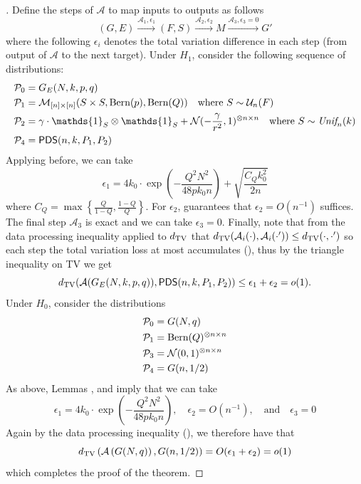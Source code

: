 \documentclass[final,12pt]{colt2023} %
\newcommand\1[1]{\mathbb{I}_{\left\{#1\right\}}}
\newcommand{\one}{\mathds{1}}
\begin{document}
\begin{proof}[]
Define the steps of $\mathcal{A}$ to map inputs to outputs as follows
$$(G, E) \xrightarrow{\mathcal{A}_1, \epsilon_1} (F, S) \xrightarrow{\mathcal{A}_2, \epsilon_2} M \xrightarrow{\mathcal{A}_{\text{3}}, \epsilon_3=0} G'$$
where the following $\epsilon_i$ denotes the total variation difference in each step (from output of $\mathcal{A}$ to the next target). Under $H_1$, consider the following sequence of distributions:
\allowdisplaybreaks
\begin{align*}
\mathcal{P}_0 &= G_E(N, k, p, q) \\
\mathcal{P}_1 &= \mathcal{M}_{[n] \times [n]}(S \times S, \textnormal{Bern}(p), \textnormal{Bern}(Q)) \quad \text{where } S \sim \mathcal{U}_n(F) \\
\mathcal{P}_2 &= \gamma \cdot \one_S\otimes \one_S + \N(-\frac{\gamma}{r^2}, 1)^{\otimes n \times n} \quad \text{where } S \sim \textit{Unif}_n(k) \\
\mathcal{P}_{\text{4}} &= \pd(n, k, P_{1}, P_{2})
\end{align*}
Applying  before, we can take
$$\epsilon_1 = 4k_0 \cdot \exp\left( - \frac{Q^2N^2}{48pk_0n} \right) + \sqrt{\frac{C_Q k_0^2}{2n}}$$
where $C_Q = \max\left\{ \frac{Q}{1 - Q}, \frac{1 - Q}{Q} \right\}$. For $\epsilon_2$,  guarantees that $\epsilon_2=O(n^{-1})$ suffices. The final step $\mathcal{A}_3$ is exact and we can take $\epsilon_3 = 0$. Finally, note that from the data processing inequality applied to $d_{\rm TV}$ that $d_{\rm TV}(\mathcal{A}_i(\cdot), \mathcal{A}_i(\cdot '))\leq d_{\rm TV}(\cdot, \cdot')$ so each step the total variation loss at most accumulates (), thus by the triangle inequality on TV we get $$d_{\rm TV}(\mathcal{A}(G_{E}(N, k, p, q)),\mathsf{PDS}(n, k, P_{1}, P_{2}))\leq \epsilon_1+\epsilon_2=o(1).$$
Under $H_0$, consider the distributions
\allowdisplaybreaks
\begin{align*}
\mathcal{P}_0 &= G(N, q) \\
\mathcal{P}_1 &= \text{Bern}(Q)^{\otimes n \times n} \\
\mathcal{P}_3 &= \mathcal{N}(0, 1)^{\otimes n \times n} \\
\mathcal{P}_{\text{4}} &= G(n, 1/2)
\end{align*}
As above, Lemmas ,  and  imply that we can take
$$\epsilon_1 = 4k_0 \cdot \exp\left( - \frac{Q^2N^2}{48pk_0n} \right), \quad \epsilon_2 = O(n^{-1}), \quad \text{and} \quad \epsilon_{\text{3}} = 0$$
Again by the data processing inequality (), we therefore have that
$$d_{\rm TV}\left( \mathcal{A}\left( G(N, q) \right), G(n, 1/2) \right) = O(\epsilon_1+\epsilon_2)=o(1)$$
which completes the proof of the theorem.\end{proof}
\end{document}
